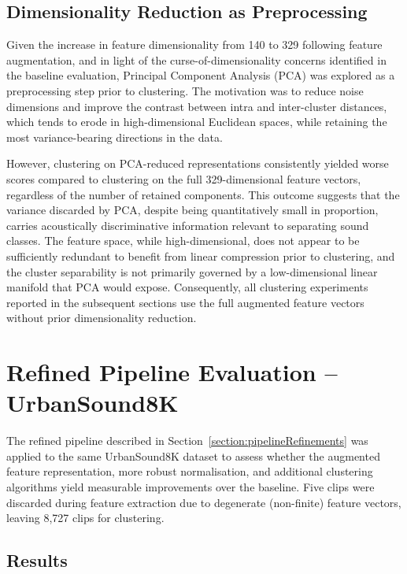 \documentclass[runningheads,a4paper,11pt]{report}
\begin{document}
\subsection{Dimensionality Reduction as Preprocessing}
\label{section:dimRedPreprocessing}

Given the increase in feature dimensionality from 140 to 329 following feature augmentation, and in light of the curse-of-dimensionality concerns identified in the baseline evaluation, Principal Component Analysis (PCA) was explored as a preprocessing step prior to clustering. The motivation was to reduce noise dimensions and improve the contrast between intra and inter-cluster distances, which tends to erode in high-dimensional Euclidean spaces, while retaining the most variance-bearing directions in the data.

However, clustering on PCA-reduced representations consistently yielded worse scores compared to clustering on the full 329-dimensional feature vectors, regardless of the number of retained components. This outcome suggests that the variance discarded by PCA, despite being quantitatively small in proportion, carries acoustically discriminative information relevant to separating sound classes. The feature space, while high-dimensional, does not appear to be sufficiently redundant to benefit from linear compression prior to clustering, and the cluster separability is not primarily governed by a low-dimensional linear manifold that PCA would expose. Consequently, all clustering experiments reported in the subsequent sections use the full augmented feature vectors without prior dimensionality reduction.

\section{Refined Pipeline Evaluation -- UrbanSound8K}
\label{section:refinedUrbanSound}

The refined pipeline described in Section~\ref{section:pipelineRefinements} was applied to the same UrbanSound8K dataset to assess whether the augmented feature representation, more robust normalisation, and additional clustering algorithms yield measurable improvements over the baseline. Five clips were discarded during feature extraction due to degenerate (non-finite) feature vectors, leaving 8,727 clips for clustering.

\subsection{Results}
\label{section:refinedResults}
\end{document}

